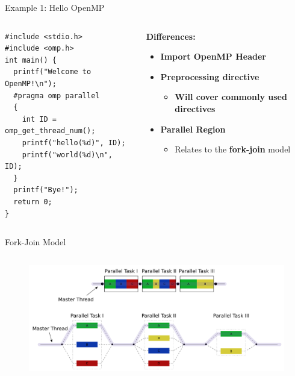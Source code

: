 \begin{frame}[fragile]{Example 1: Hello OpenMP}
  \begin{columns}[T] %
    \begin{column}{0.6\textwidth}
      \vspace{-10pt} %
      \begin{verbatim}
#include <stdio.h>
#include <omp.h>
int main() {
  printf("Welcome to OpenMP!\n");
  #pragma omp parallel
  {
    int ID = omp_get_thread_num();
    printf("hello(%d)", ID);
    printf("world(%d)\n", ID);
  }
  printf("Bye!");
  return 0;
}
      \end{verbatim}
    \end{column}
    \begin{column}{0.4\textwidth}
      \vspace{2pt}
      \textbf{Differences:}
      \begin{itemize}
        \item \textbf<1>{Import OpenMP Header}
              \vspace{2.2em}
        \item \textbf<2>{Preprocessing directive}
              \begin{itemize}
                \item<2-> \textbf<2>{Will cover commonly used directives}
              \end{itemize}
        \item \textbf<3>{Parallel Region}
              \begin{itemize}
                \item<3> Relates to the \textbf<3>{fork-join} model
              \end{itemize}
      \end{itemize}
    \end{column}
  \end{columns}
\end{frame}

\begin{frame}[fragile]{Fork-Join Model}
  \begin{columns}[T] %
    \begin{column}{1\textwidth}
      \vspace{-5pt}
      \begin{figure}
        \centering
        \includegraphics[width=1\linewidth]{day8_am/img/fork-join2.png}
      \end{figure}
    \end{column}
  \end{columns}
\end{frame}

